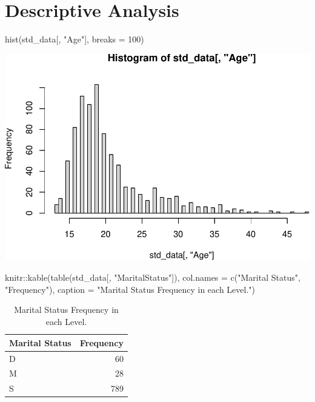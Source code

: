 \documentclass[
]{article}
\newenvironment{Shaded}{\begin{snugshade}}{\end{snugshade}}
\newcommand{\AttributeTok}[1]{\textcolor[rgb]{0.77,0.63,0.00}{#1}}
\newcommand{\DecValTok}[1]{\textcolor[rgb]{0.00,0.00,0.81}{#1}}
\newcommand{\FunctionTok}[1]{\textcolor[rgb]{0.00,0.00,0.00}{#1}}
\newcommand{\NormalTok}[1]{#1}
\newcommand{\SpecialCharTok}[1]{\textcolor[rgb]{0.00,0.00,0.00}{#1}}
\newcommand{\StringTok}[1]{\textcolor[rgb]{0.31,0.60,0.02}{#1}}
\begin{document}
\hypertarget{descriptive-analysis}{%
\section{Descriptive Analysis}\label{descriptive-analysis}}

\begin{Shaded}
\begin{Highlighting}[]
\FunctionTok{hist}\NormalTok{(std\_data[, }\StringTok{"Age"}\NormalTok{], }\AttributeTok{breaks =} \DecValTok{100}\NormalTok{)}
\end{Highlighting}
\end{Shaded}

\includegraphics{practical_files/figure-latex/unnamed-chunk-3-1.pdf}

\begin{Shaded}
\begin{Highlighting}[]
\NormalTok{knitr}\SpecialCharTok{::}\FunctionTok{kable}\NormalTok{(}\FunctionTok{table}\NormalTok{(std\_data[, }\StringTok{"MaritalStatus"}\NormalTok{]), }\AttributeTok{col.names =} \FunctionTok{c}\NormalTok{(}\StringTok{"Marital Status"}\NormalTok{, }\StringTok{"Frequency"}\NormalTok{), }\AttributeTok{caption =} \StringTok{"Marital Status Frequency in each Level."}\NormalTok{)}
\end{Highlighting}
\end{Shaded}

\begin{table}

\caption{\label{tab:unnamed-chunk-4}Marital Status Frequency in each Level.}
\centering
\begin{tabular}[t]{l|r}
\hline
Marital Status & Frequency\\
\hline
D & 60\\
\hline
M & 28\\
\hline
S & 789\\
\hline
\end{tabular}
\end{table}
\end{document}
